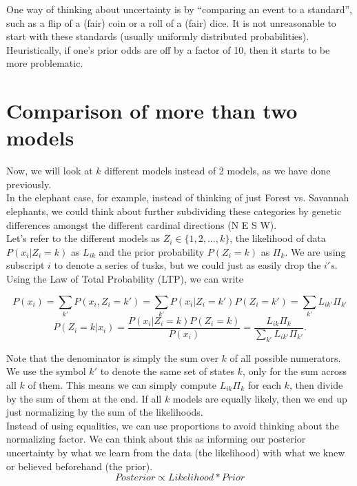 \documentclass[12pt]{report}
\begin{document}
One way of thinking about uncertainty is by ``comparing an event to a standard'', such as a flip of a (fair) coin or a roll of a (fair) dice. It is not unreasonable to start with these standards (usually uniformly distributed probabilities). Heuristically, if one's prior odds are off by a factor of 10, then it starts to be more problematic.

\section{Comparison of more than two models}

Now, we will look at $k$ different models instead of 2 models, as we have done previously.\\

In the elephant case, for example, instead of thinking of just Forest vs. Savannah elephants, we could think about further subdividing these categories by genetic differences amongst the different cardinal directions (N E S W). \\

Let's refer to the different models as $Z_i \in \{1,2,...,k\}$, the likelihood of data $P(x_i|Z_i=k)$ as $L_{ik}$ and the prior probability $P(Z_i=k)$ as $\Pi_k$. We are using subscript $i$ to denote a series of tusks, but we could just as easily drop the $i's$.\\

Using the Law of Total Probability (LTP), we can write

\[
P(x_i) = \sum_{k'} P(x_i,Z_i=k') = \sum_{k'} P(x_i | Z_i=k') P(Z_i = k') = \sum_{k'} L_{ik'} \Pi_{k'}
\]
\[
P(Z_i=k|x_i) = \frac{P(x_i|Z_i=k)P(Z_i=k)}{P(x_i)} = \frac{L_{ik}\Pi_k}{\sum_{k'} L_{ik'} \Pi_{k'}}.
\]

Note that the denominator is simply the sum over $k$ of all possible numerators. We use the symbol $k'$ to denote the same set of states $k$, only for the sum across all $k$ of them. This means we can simply compute $L_{ik}\Pi_k$ for each $k$, then divide by the sum of them at the end. If all $k$ models are equally likely, then we end up just normalizing by the sum of the likelihoods.\\

Instead of using equalities, we can use proportions to avoid thinking about the normalizing factor. We can think about this as informing our posterior uncertainty by what we learn from the data (the likelihood) with what we knew or believed beforehand (the prior).
\[
Posterior \propto Likelihood * Prior
\]
\end{document}
